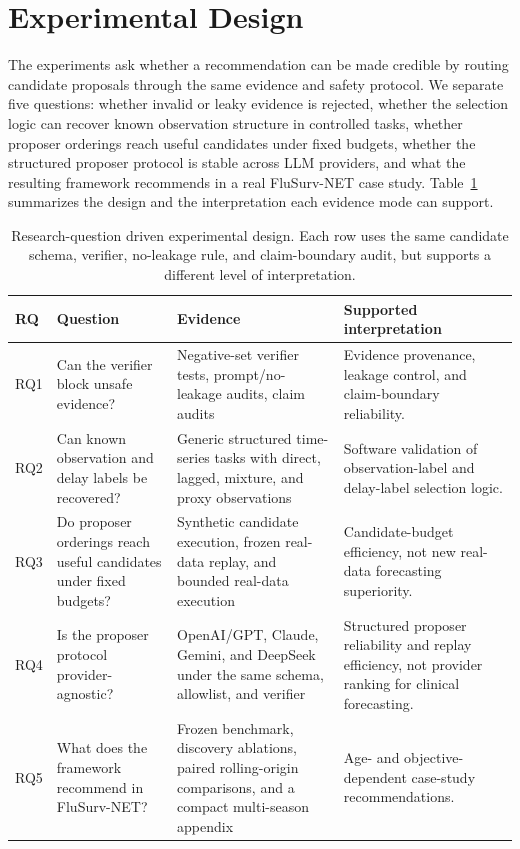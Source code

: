 \section{Experimental Design}

The experiments ask whether a recommendation can be made credible by routing
candidate proposals through the same evidence and safety protocol. We separate
five questions: whether invalid or leaky evidence is rejected, whether the
selection logic can recover known observation structure in controlled tasks,
whether proposer orderings reach useful candidates under fixed budgets, whether
the structured proposer protocol is stable across LLM providers, and what the
resulting framework recommends in a real FluSurv-NET case study.
Table~\ref{tab:rqs} summarizes the design and the interpretation each evidence
mode can support.

\begin{table}[t]
\centering
\small
\caption{Research-question driven experimental design. Each row uses the same
candidate schema, verifier, no-leakage rule, and claim-boundary audit, but
supports a different level of interpretation.}
\label{tab:rqs}
\begin{tabularx}{\textwidth}{p{0.9cm}p{3.3cm}p{4.0cm}X}
\toprule
RQ & Question & Evidence & Supported interpretation \\
\midrule
RQ1 & Can the verifier block unsafe evidence? &
Negative-set verifier tests, prompt/no-leakage audits, claim audits &
Evidence provenance, leakage control, and claim-boundary reliability. \\
RQ2 & Can known observation and delay labels be recovered? &
Generic structured time-series tasks with direct, lagged, mixture, and proxy
observations &
Software validation of observation-label and delay-label selection logic. \\
RQ3 & Do proposer orderings reach useful candidates under fixed budgets? &
Synthetic candidate execution, frozen real-data replay, and bounded real-data
execution &
Candidate-budget efficiency, not new real-data forecasting superiority. \\
RQ4 & Is the proposer protocol provider-agnostic? &
OpenAI/GPT, Claude, Gemini, and DeepSeek under the same schema, allowlist, and
verifier &
Structured proposer reliability and replay efficiency, not provider ranking
for clinical forecasting. \\
RQ5 & What does the framework recommend in FluSurv-NET? &
Frozen benchmark, discovery ablations, paired rolling-origin comparisons, and
a compact multi-season appendix &
Age- and objective-dependent case-study recommendations. \\
\bottomrule
\end{tabularx}
\end{table}

